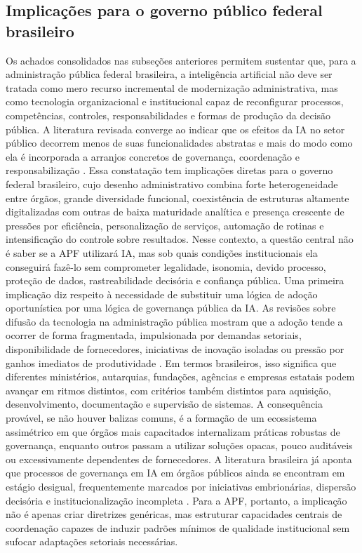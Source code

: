 \documentclass[12pt,a4paper]{article}
\begin{document}
\subsection{Implicações para o governo público federal brasileiro}
\label{sec:org60cbea2}
Os achados consolidados nas subseções anteriores permitem sustentar que, para a administração pública federal brasileira, a inteligência artificial não deve ser tratada como mero recurso incremental de modernização administrativa, mas como tecnologia organizacional e institucional capaz de reconfigurar processos, competências, controles, responsabilidades e formas de produção da decisão pública. A literatura revisada converge ao indicar que os efeitos da IA no setor público decorrem menos de suas funcionalidades abstratas e mais do modo como ela é incorporada a arranjos concretos de governança, coordenação e responsabilização \autocite{madan2022ai} \autocite{criado2024artificial} \autocite{batool2025ai}. Essa constatação tem implicações diretas para o governo federal brasileiro, cujo desenho administrativo combina forte heterogeneidade entre órgãos, grande diversidade funcional, coexistência de estruturas altamente digitalizadas com outras de baixa maturidade analítica e presença crescente de pressões por eficiência, personalização de serviços, automação de rotinas e intensificação do controle sobre resultados. Nesse contexto, a questão central não é saber se a APF utilizará IA, mas sob quais condições institucionais ela conseguirá fazê-lo sem comprometer legalidade, isonomia, devido processo, proteção de dados, rastreabilidade decisória e confiança pública.
Uma primeira implicação diz respeito à necessidade de substituir uma lógica de adoção oportunística por uma lógica de governança pública da IA. As revisões sobre difusão da tecnologia na administração pública mostram que a adoção tende a ocorrer de forma fragmentada, impulsionada por demandas setoriais, disponibilidade de fornecedores, iniciativas de inovação isoladas ou pressão por ganhos imediatos de produtividade \autocite{madan2022ai} \autocite{alhosani2024opportunities}. Em termos brasileiros, isso significa que diferentes ministérios, autarquias, fundações, agências e empresas estatais podem avançar em ritmos distintos, com critérios também distintos para aquisição, desenvolvimento, documentação e supervisão de sistemas. A consequência provável, se não houver balizas comuns, é a formação de um ecossistema assimétrico em que órgãos mais capacitados internalizam práticas robustas de governança, enquanto outros passam a utilizar soluções opacas, pouco auditáveis ou excessivamente dependentes de fornecedores. A literatura brasileira já aponta que processos de governança em IA em órgãos públicos ainda se encontram em estágio desigual, frequentemente marcados por iniciativas embrionárias, dispersão decisória e institucionalização incompleta \autocite{goulart2025processos} \autocite{serra2024a}. Para a APF, portanto, a implicação não é apenas criar diretrizes genéricas, mas estruturar capacidades centrais de coordenação capazes de induzir padrões mínimos de qualidade institucional sem sufocar adaptações setoriais necessárias.
\end{document}
